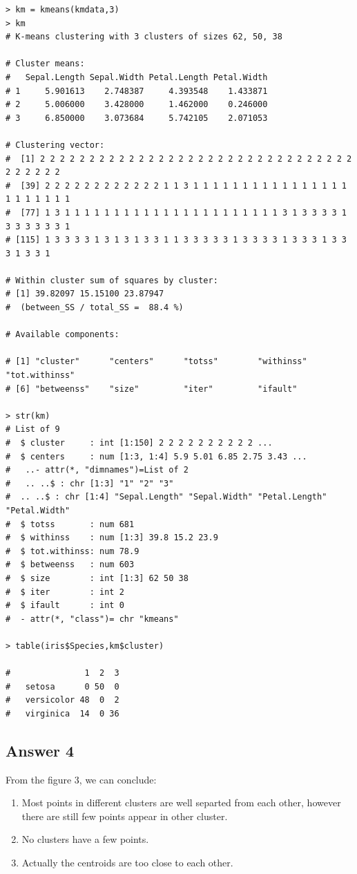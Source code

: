 \documentclass{article}
\begin{document}
\begin{lstlisting}
> km = kmeans(kmdata,3)
> km
# K-means clustering with 3 clusters of sizes 62, 50, 38

# Cluster means:
#   Sepal.Length Sepal.Width Petal.Length Petal.Width
# 1     5.901613    2.748387     4.393548    1.433871
# 2     5.006000    3.428000     1.462000    0.246000
# 3     6.850000    3.073684     5.742105    2.071053

# Clustering vector:
#  [1] 2 2 2 2 2 2 2 2 2 2 2 2 2 2 2 2 2 2 2 2 2 2 2 2 2 2 2 2 2 2 2 2 2 2 2 2 2 2
#  [39] 2 2 2 2 2 2 2 2 2 2 2 2 1 1 3 1 1 1 1 1 1 1 1 1 1 1 1 1 1 1 1 1 1 1 1 1 1 1
#  [77] 1 3 1 1 1 1 1 1 1 1 1 1 1 1 1 1 1 1 1 1 1 1 1 1 3 1 3 3 3 3 1 3 3 3 3 3 3 1
# [115] 1 3 3 3 3 1 3 1 3 1 3 3 1 1 3 3 3 3 3 1 3 3 3 3 1 3 3 3 1 3 3 3 1 3 3 1

# Within cluster sum of squares by cluster:
# [1] 39.82097 15.15100 23.87947
#  (between_SS / total_SS =  88.4 %)

# Available components:

# [1] "cluster"      "centers"      "totss"        "withinss"     "tot.withinss"
# [6] "betweenss"    "size"         "iter"         "ifault"      

> str(km)
# List of 9
#  $ cluster     : int [1:150] 2 2 2 2 2 2 2 2 2 2 ...
#  $ centers     : num [1:3, 1:4] 5.9 5.01 6.85 2.75 3.43 ...
#   ..- attr(*, "dimnames")=List of 2
#   .. ..$ : chr [1:3] "1" "2" "3"
#  .. ..$ : chr [1:4] "Sepal.Length" "Sepal.Width" "Petal.Length" "Petal.Width"
#  $ totss       : num 681
#  $ withinss    : num [1:3] 39.8 15.2 23.9
#  $ tot.withinss: num 78.9
#  $ betweenss   : num 603
#  $ size        : int [1:3] 62 50 38
#  $ iter        : int 2
#  $ ifault      : int 0
#  - attr(*, "class")= chr "kmeans"

> table(iris$Species,km$cluster)
            
#               1  2  3
#   setosa      0 50  0
#   versicolor 48  0  2
#   virginica  14  0 36

\end{lstlisting}


\subsection{Answer 4}
From the figure 3, we can conclude:
\begin{enumerate}
    \item Most points in different clusters are well separted from each other, however there are still few points appear in other cluster.
    \item No clusters have a few points.
    \item Actually the centroids are too close to each other.
\end{enumerate}
\end{document}
